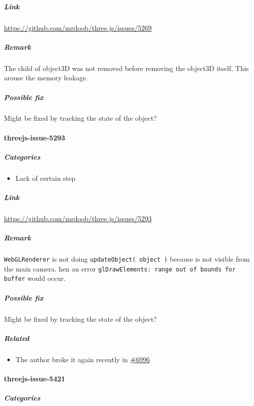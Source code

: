 \documentclass[]{article}
\begin{document}
\subparagraph{Link}\label{link-6}

\url{https://github.com/mrdoob/three.js/issues/5269}

\subparagraph{Remark}\label{remark-6}

The child of object3D was not removed before removing the object3D
itself. This arouse the memory leakage.

\subparagraph{Possible fix}\label{possible-fix-5}

Might be fixed by tracking the state of the object?

\paragraph{threejs-issue-5293}\label{threejs-issue-5293}

\subparagraph{Categories}\label{categories-7}

\begin{itemize}
\itemsep1pt\parskip0pt
\item
  Lack of certain step
\end{itemize}

\subparagraph{Link}\label{link-7}

\url{https://github.com/mrdoob/three.js/issues/5293}

\subparagraph{Remark}\label{remark-7}

\texttt{WebGLRenderer} is not doing \texttt{updateObject( object )}
because is not visible from the main camera. hen an error
\texttt{glDrawElements: range out of bounds for buffer} would occur.

\subparagraph{Possible fix}\label{possible-fix-6}

Might be fixed by tracking the state of the object?

\subparagraph{Related}\label{related-1}

\begin{itemize}
\itemsep1pt\parskip0pt
\item
  The author broke it again recently in
  \href{https://github.com/mrdoob/three.js/issues/6996}{\#6996}
\end{itemize}

\paragraph{threejs-issue-5421}\label{threejs-issue-5421}

\subparagraph{Categories}\label{categories-8}
\end{document}

